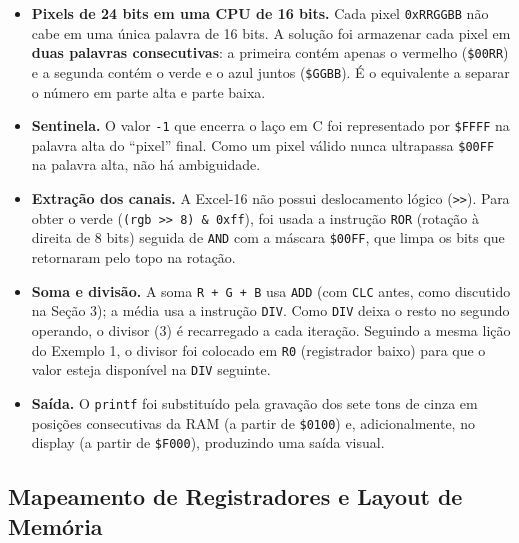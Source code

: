 \documentclass[12pt, a4paper]{article}
\begin{document}
\begin{itemize}[itemsep=4pt]
  \item \textbf{Pixels de 24 bits em uma CPU de 16 bits.} Cada pixel \texttt{0xRRGGBB} não cabe em uma única palavra de 16 bits. A solução foi armazenar cada pixel em \textbf{duas palavras consecutivas}: a primeira contém apenas o vermelho (\texttt{\$00RR}) e a segunda contém o verde e o azul juntos (\texttt{\$GGBB}). É o equivalente a separar o número em parte alta e parte baixa.
  \item \textbf{Sentinela.} O valor \texttt{-1} que encerra o laço em C foi representado por \texttt{\$FFFF} na palavra alta do ``pixel'' final. Como um pixel válido nunca ultrapassa \texttt{\$00FF} na palavra alta, não há ambiguidade.
  \item \textbf{Extração dos canais.} A Excel-16 não possui deslocamento lógico (\texttt{>>}). Para obter o verde (\texttt{(rgb >> 8) \& 0xff}), foi usada a instrução \texttt{ROR} (rotação à direita de 8 bits) seguida de \texttt{AND} com a máscara \texttt{\$00FF}, que limpa os bits que retornaram pelo topo na rotação.
  \item \textbf{Soma e divisão.} A soma \texttt{R + G + B} usa \texttt{ADD} (com \texttt{CLC} antes, como discutido na Seção 3); a média usa a instrução \texttt{DIV}. Como \texttt{DIV} deixa o resto no segundo operando, o divisor (3) é recarregado a cada iteração. Seguindo a mesma lição do Exemplo 1, o divisor foi colocado em \texttt{R0} (registrador baixo) para que o valor esteja disponível na \texttt{DIV} seguinte.
  \item \textbf{Saída.} O \texttt{printf} foi substituído pela gravação dos sete tons de cinza em posições consecutivas da RAM (a partir de \texttt{\$0100}) e, adicionalmente, no display (a partir de \texttt{\$F000}), produzindo uma saída visual.
\end{itemize}

\subsection{Mapeamento de Registradores e Layout de Memória}
\end{document}
